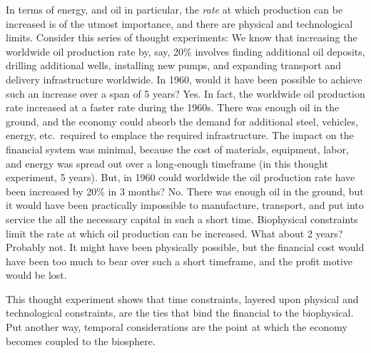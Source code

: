 In terms of energy, and oil in particular, 
the \emph{rate} at which production can be increased 
is of the utmost importance, and
there are physical and technological limits. 
Consider this series of thought experiments:
We know that increasing the worldwide oil production rate by, say, 20\% 
involves
finding additional oil deposits, 
drilling additional wells, 
installing new pumps,
and expanding transport and delivery infrastructure worldwide.
In 1960, would it have been possible to achieve such an increase 
over a span of 5 years?
Yes. 
In fact, the worldwide oil production rate increased at a faster rate 
during the 1960s.
There was enough oil in the ground, 
and the economy could absorb the demand 
for additional steel, vehicles, energy, etc.\ required to emplace
the required infrastructure.
The impact on the financial system was minimal, 
because the cost of materials, equipment, labor, and energy
was spread out over a long-enough timeframe (in this thought experiment, 5 years). 
But, in 1960 could worldwide the oil production rate have been increased 
by 20\% in 3 months?
No.
There was enough oil in the ground,
but it would have been practically impossible to manufacture,
transport, and put into service the all the necessary capital in such a short time.
Biophysical constraints limit the rate at which oil production can be increased.
What about 2 years?
Probably not.
It might have been physically possible, 
but the financial cost would have been too much to bear over such a short timeframe,
and the profit motive would be lost.

This thought experiment shows that time constraints,
layered upon physical and technological constraints, 
are the ties that bind the financial to the biophysical.
Put another way, temporal considerations are the point at which the economy 
becomes coupled to the biosphere.

